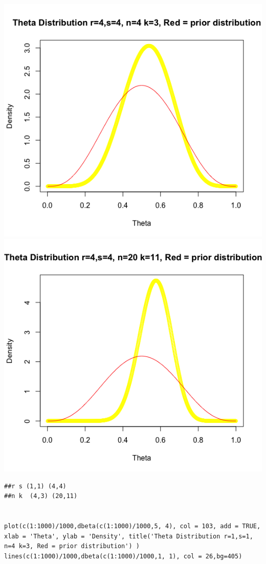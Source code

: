 \documentclass[svgnames]{article}
\begin{document}
\begin{enumerate}[label = \alph*.]
\includegraphics[scale=.5]{4-4-4-3}
$$$$
\includegraphics[scale=.5]{4-4-20-11}
\begin{lstlisting}
##r s (1,1) (4,4)
##n k  (4,3) (20,11)


plot(c(1:1000)/1000,dbeta(c(1:1000)/1000,5, 4), col = 103, add = TRUE, xlab = 'Theta', ylab = 'Density', title('Theta Distribution r=1,s=1, n=4 k=3, Red = prior distribution') )
lines(c(1:1000)/1000,dbeta(c(1:1000)/1000,1, 1), col = 26,bg=405)


\end{lstlisting}
\end{enumerate}
\end{document}
